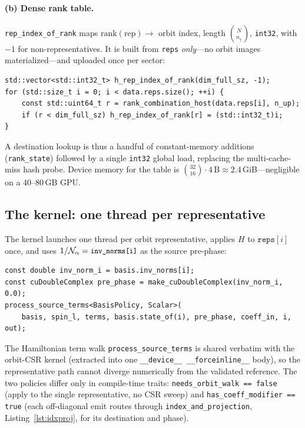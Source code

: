 \documentclass[11pt]{article}
\newcommand{\Norm}{\mathcal{N}}
\newcommand{\reps}{\texttt{reps}}
\newcommand{\code}[1]{\texttt{\small #1}}
\begin{document}
\paragraph{(b) Dense rank table.} \code{rep\_index\_of\_rank} maps
$\mathrm{rank}(\text{rep})\rightarrow$ orbit index, length
$\binom{N}{n_{\uparrow}}$, \code{int32}, with $-1$ for non-representatives. It is
built from \reps{} \emph{only}---no orbit images materialized---and uploaded once
per sector:
\begin{lstlisting}[caption={Reverse table built from reps only.
\code{src/symmetry/streaming\_symmetry\_gpu\_mirror.cu}}]
std::vector<std::int32_t> h_rep_index_of_rank(dim_full_sz, -1);
for (std::size_t i = 0; i < data.reps.size(); ++i) {
    const std::uint64_t r = rank_combination_host(data.reps[i], n_up);
    if (r < dim_full_sz) h_rep_index_of_rank[r] = (std::int32_t)i;
}
\end{lstlisting}
A destination lookup is thus a handful of constant-memory additions
(\code{rank\_state}) followed by a single \code{int32} global load, replacing the
multi-cache-miss hash probe. Device memory for the table is
$\binom{32}{16}\cdot 4\,\text{B}\approx 2.4$\,GiB---negligible on a 40--80\,GB
GPU.

\subsection{The kernel: one thread per representative}

The kernel launches one thread per orbit representative, applies $H$ to
$\reps[i]$ once, and uses $1/\Norm_\alpha=\code{inv\_norms[i]}$ as the source
pre-phase:
\begin{lstlisting}[caption={Rep kernel core. \code{include/ed/matvec/term\_kernels\_gpu.cuh}}]
const double inv_norm_i = basis.inv_norms[i];
const cuDoubleComplex pre_phase = make_cuDoubleComplex(inv_norm_i, 0.0);
process_source_terms<BasisPolicy, Scalar>(
    basis, spin_l, terms, basis.state_of(i), pre_phase, coeff_in, i, out);
\end{lstlisting}
The Hamiltonian term walk \code{process\_source\_terms} is shared verbatim with
the orbit-CSR kernel (extracted into one \code{\_\_device\_\_
\_\_forceinline\_\_} body), so the representative path cannot diverge
numerically from the validated reference. The two policies differ only in
compile-time traits: \code{needs\_orbit\_walk == false} (apply to the single
representative, no CSR sweep) and \code{has\_coeff\_modifier == true} (each
off-diagonal emit routes through \code{index\_and\_projection},
Listing~\ref{lst:idxproj}, for its destination and phase).
\end{document}
